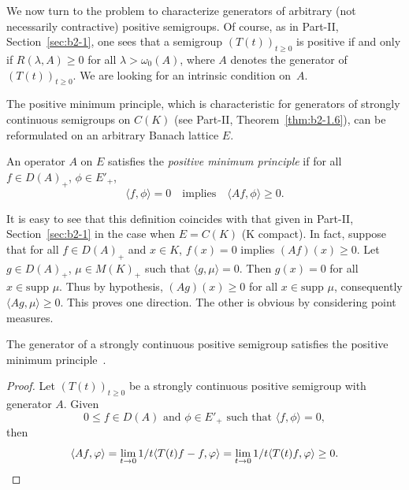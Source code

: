 We now turn to the problem to characterize generators of arbitrary (not necessarily contractive) positive semigroups.
Of course, as in Part-II, Section~\ref{sec:b2-1}, 
one sees that a semigroup $(T(t))_{t \geq 0}$ is positive if and only if\/ $R(\lambda,A) \geq 0$ for all $\lambda > \omega_{0}(A)$, where $A$ denotes the generator of\/ $(T(t))_{t \geq 0}$.
We are looking for an intrinsic condition on~$A$.

The positive minimum principle, which is characteristic for generators of strongly continuous semigroups on $C(K)$ (see 
Part-II, Theorem~\ref{thm:b2-1.6}), can be reformulated on an arbitrary Banach lattice $E$.
\begin{definition}\label{def:c2-1.6}
%
An operator $A$ on $E$ satisfies the \emph{positive minimum principle} if for all $f \in D(A)_{+}$, $\phi \in E'_{+}$,
\begin{equation}\label{eq:c2-P} \tag{P}
\langle f,\phi \rangle = 0 \quad \text{implies} \quad \langle Af,\phi \rangle \geq 0.
\end{equation}
\end{definition}
\begin{remark*}\label{rem:c2-1.6}
%
It is easy to see that this definition coincides with that given in Part-II, Section~\ref{sec:b2-1} 
in the case when $E = C(K)$ (K compact).
In fact, suppose that for all $f \in D(A)_{+}$ and $x \in K$, $f(x) = 0$ implies $(Af)(x) \geq 0$.
Let $g \in D(A)_{+}$, $\mu \in M(K)_{+}$ such that $\langle g,\mu \rangle = 0$.
Then $g(x) = 0$ for all $x \in \text{supp } \mu$.
Thus by hypothesis, $(Ag)(x) \geq 0$ for all $x \in \text{supp } \mu$,
consequently $\langle Ag,\mu \rangle \geq 0$.
This proves one direction.
The other is obvious by considering point measures.
\end{remark*}
\begin{proposition}\label{prop:c2-1.7}
%
The generator of a strongly continuous positive semigroup satisfies the positive minimum 
principle~.
\end{proposition}
\begin{proof}
Let $(T(t))_{t \geq 0}$ be a strongly continuous positive semigroup with generator $A$. Given
\[
0 \leq f \in D(A) \text{ and } \phi \in E'_{+} \text{ such that } \langle f,\phi \rangle = 0 ,
\]
then 
\begin{equation*}
\langle Af,\phi \rangle = \lim_{t \to 0} 1/t \langle T(t)f - f, \phi \rangle = \lim_{t \to 0} 1/t \langle T(t)f, \phi \rangle \geq 0 .
\qedhere
\end{equation*}
\end{proof}
